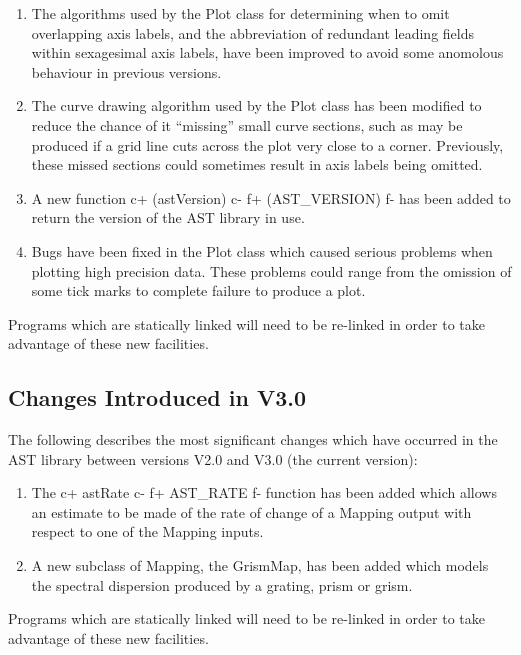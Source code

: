 \documentclass[twoside,11pt]{article}
\newcommand{\xlabel}[1]{}
\begin{document}
\begin{enumerate}
\item The algorithms used by the Plot class for determining when to omit
overlapping axis labels, and the abbreviation of redundant leading fields 
within sexagesimal axis labels, have been improved to avoid some anomolous
behaviour in previous versions.

\item The curve drawing algorithm used by the Plot class has been
modified to reduce the chance of it ``missing'' small curve sections,
such as may be produced if a grid line cuts across the plot very close to
a corner. Previously, these missed sections could sometimes result in 
axis labels being omitted.

\item A new function
c+
(astVersion)
c-
f+
(AST\_VERSION)
f-
has been added to return the version of the AST library in use.

\item Bugs have been fixed in the Plot class which caused serious problems
when plotting high precision data. These problems could range from the
omission of some tick marks to complete failure to produce a plot.

\end{enumerate}

Programs which are statically linked will need to be re-linked in
order to take advantage of these new facilities.


\subsection{\xlabel{changes}\xlabel{list_of_most_recent_changes}Changes
Introduced in V3.0}

The following describes the most significant changes which have
occurred in the AST library between versions V2.0 and V3.0 (the
current version):

\begin{enumerate}

\item The 
c+
astRate
c-
f+
AST\_RATE
f-
function has been added which allows an estimate to be made of the rate of 
change of a Mapping output with respect to one of the Mapping inputs. 

\item A new subclass of Mapping, the GrismMap, has been added which
models the spectral dispersion produced by a grating, prism or grism.

\end{enumerate}

Programs which are statically linked will need to be re-linked in
order to take advantage of these new facilities.
\end{document}
